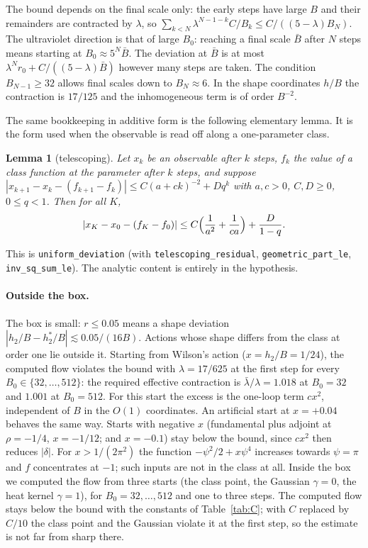 \documentclass[11pt,a4paper]{article}
\newtheorem{lemma}{Lemma}[section]
\theoremstyle{definition}
\theoremstyle{remark}
\newcommand{\code}[1]{\texttt{#1}}
\begin{document}
The bound depends on the final scale only: the early steps have large $B$ and their remainders are contracted by $\lambda$, so $\sum_{k<N}\lambda^{N-1-k}C/B_k\le C/((5-\lambda)B_N)$.
The ultraviolet direction is that of large $B_0$: reaching a final scale $\bar B$ after $N$ steps means starting at $B_0\approx5^N\bar B$.
The deviation at $\bar B$ is at most $\lambda^Nr_0+C/((5-\lambda)\bar B)$ however many steps are taken.
The condition $B_{N-1}\ge32$ allows final scales down to $B_N\approx6$.
In the shape coordinates $h/B$ the contraction is $17/125$ and the inhomogeneous term is of order $B^{-2}$.

The same bookkeeping in additive form is the following elementary lemma.
It is the form used when the observable is read off along a one-parameter class.

\begin{lemma}[telescoping]\label{lem:tele}
Let $x_k$ be an observable after $k$ steps, $f_k$ the value of a class function at the parameter after $k$ steps, and suppose $|x_{k+1}-x_k-(f_{k+1}-f_k)|\le C(a+ck)^{-2}+Dq^k$ with $a,c>0$, $C,D\ge0$, $0\le q<1$. Then for all $K$,
\[
|x_K-x_0-(f_K-f_0)|\le C\Bigl(\frac1{a^2}+\frac1{ca}\Bigr)+\frac{D}{1-q}.
\]
\end{lemma}

This is \code{uniform\_deviation} (with \code{telescoping\_residual}, \code{geometric\_part\_le}, \code{inv\_sq\_sum\_le}).
The analytic content is entirely in the hypothesis.

\paragraph{Outside the box.}
The box is small: $r\le0.05$ means a shape deviation $|h_2/B-h_2^*/B|\lesssim0.05/(16B)$.
Actions whose shape differs from the class at order one lie outside it.
Starting from Wilson's action ($x=h_2/B=1/24$), the computed flow violates the bound with $\lambda=17/625$ at the first step for every $B_0\in\{32,\dots,512\}$: the required effective contraction is $\bar\lambda/\lambda=1.018$ at $B_0=32$ and $1.001$ at $B_0=512$.
For this start the excess is the one-loop term $cx^2$, independent of $B$ in the $O(1)$ coordinates.
An artificial start at $x=+0.04$ behaves the same way.
Starts with negative $x$ (fundamental plus adjoint at $\rho=-1/4$, $x=-1/12$; and $x=-0.1$) stay below the bound, since $cx^2$ then reduces $|\delta|$.
For $x>1/(2\pi^2)$ the function $-\psi^2/2+x\psi^4$ increases towards $\psi=\pi$ and $f$ concentrates at $-1$; such inputs are not in the class at all.
Inside the box we computed the flow from three starts (the class point, the Gaussian $\gamma=0$, the heat kernel $\gamma=1$), for $B_0=32,\dots,512$ and one to three steps.
The computed flow stays below the bound with the constants of Table~\ref{tab:C}; with $C$ replaced by $C/10$ the class point and the Gaussian violate it at the first step, so the estimate is not far from sharp there.
\end{document}
